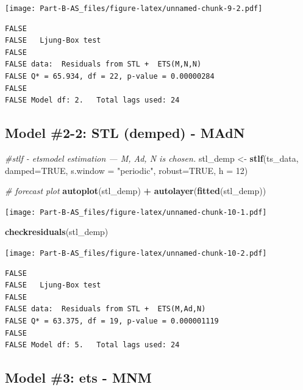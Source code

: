 \documentclass[openany]{book}
\newenvironment{Shaded}{\begin{snugshade}}{\end{snugshade}}
\newcommand{\KeywordTok}[1]{\textcolor[rgb]{0.13,0.29,0.53}{\textbf{#1}}}
\newcommand{\DataTypeTok}[1]{\textcolor[rgb]{0.13,0.29,0.53}{#1}}
\newcommand{\DecValTok}[1]{\textcolor[rgb]{0.00,0.00,0.81}{#1}}
\newcommand{\StringTok}[1]{\textcolor[rgb]{0.31,0.60,0.02}{#1}}
\newcommand{\CommentTok}[1]{\textcolor[rgb]{0.56,0.35,0.01}{\textit{#1}}}
\newcommand{\OtherTok}[1]{\textcolor[rgb]{0.56,0.35,0.01}{#1}}
\newcommand{\OperatorTok}[1]{\textcolor[rgb]{0.81,0.36,0.00}{\textbf{#1}}}
\newcommand{\NormalTok}[1]{#1}
\begin{document}
\texttt{[image: Part-B-AS\_files/figure-latex/unnamed-chunk-9-2.pdf]}

\begin{verbatim}
FALSE 
FALSE   Ljung-Box test
FALSE 
FALSE data:  Residuals from STL +  ETS(M,N,N)
FALSE Q* = 65.934, df = 22, p-value = 0.00000284
FALSE 
FALSE Model df: 2.   Total lags used: 24
\end{verbatim}

\subsection{Model \#2-2: STL (demped) -
MAdN}\label{model-2-2-stl-demped---madn}

\begin{Shaded}
\begin{Highlighting}[]
\CommentTok{#stlf - etsmodel estimation --- M, Ad, N is chosen.}
\NormalTok{stl_demp <-}\StringTok{ }\KeywordTok{stlf}\NormalTok{(ts_data, }\DataTypeTok{damped=}\OtherTok{TRUE}\NormalTok{, }\DataTypeTok{s.window =} \StringTok{"periodic"}\NormalTok{, }\DataTypeTok{robust=}\OtherTok{TRUE}\NormalTok{, }\DataTypeTok{h =} \DecValTok{12}\NormalTok{)}

\CommentTok{# forecast plot}
\KeywordTok{autoplot}\NormalTok{(stl_demp) }\OperatorTok{+}\StringTok{ }\KeywordTok{autolayer}\NormalTok{(}\KeywordTok{fitted}\NormalTok{(stl_demp))}
\end{Highlighting}
\end{Shaded}

\texttt{[image: Part-B-AS\_files/figure-latex/unnamed-chunk-10-1.pdf]}

\begin{Shaded}
\begin{Highlighting}[]
\KeywordTok{checkresiduals}\NormalTok{(stl_demp)}
\end{Highlighting}
\end{Shaded}

\texttt{[image: Part-B-AS\_files/figure-latex/unnamed-chunk-10-2.pdf]}

\begin{verbatim}
FALSE 
FALSE   Ljung-Box test
FALSE 
FALSE data:  Residuals from STL +  ETS(M,Ad,N)
FALSE Q* = 63.375, df = 19, p-value = 0.000001119
FALSE 
FALSE Model df: 5.   Total lags used: 24
\end{verbatim}

\subsection{Model \#3: ets - MNM}\label{model-3-ets---mnm}
\end{document}
